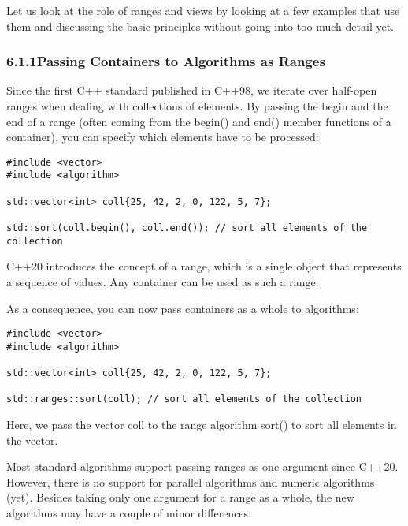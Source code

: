 

Let us look at the role of ranges and views by looking at a few examples that use them and discussing the basic principles without going into too much detail yet.

\subsubsection*{ 6.1.1\hspace{0.2cm}Passing Containers to Algorithms as Ranges}

Since the first C++ standard published in C++98, we iterate over half-open ranges when dealing with collections of elements. By passing the begin and the end of a range (often coming from the begin() and end() member functions of a container), you can specify which elements have to be processed:

\begin{lstlisting}[style=styleCXX]
#include <vector>
#include <algorithm>

std::vector<int> coll{25, 42, 2, 0, 122, 5, 7};

std::sort(coll.begin(), coll.end()); // sort all elements of the collection
\end{lstlisting}

C++20 introduces the concept of a range, which is a single object that represents a sequence of values. Any container can be used as such a range.

As a consequence, you can now pass containers as a whole to algorithms:

\begin{lstlisting}[style=styleCXX]
#include <vector>
#include <algorithm>

std::vector<int> coll{25, 42, 2, 0, 122, 5, 7};

std::ranges::sort(coll); // sort all elements of the collection
\end{lstlisting}

Here, we pass the vector coll to the range algorithm sort() to sort all elements in the vector.

Most standard algorithms support passing ranges as one argument since C++20. However, there is no support for parallel algorithms and numeric algorithms (yet). Besides taking only one argument for a range as a whole, the new algorithms may have a couple of minor differences:

